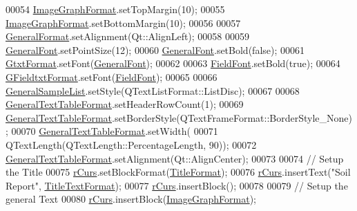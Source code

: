 \begin{DoxyCode}
00054   \hyperlink{class_q_report_generator_a19451127788bb6c68907b312a0a8b750}{ImageGraphFormat}.setTopMargin(10);
00055   \hyperlink{class_q_report_generator_a19451127788bb6c68907b312a0a8b750}{ImageGraphFormat}.setBottomMargin(10);
00056 
00057   \hyperlink{class_q_report_generator_a9a18bc94ca92a730ae0f13d60a6b5e0a}{GeneralFormat}.setAlignment(Qt::AlignLeft);
00058 
00059   \hyperlink{class_q_report_generator_ab7022962a87365f93a5e168d946ebd85}{GeneralFont}.setPointSize(12);
00060   \hyperlink{class_q_report_generator_ab7022962a87365f93a5e168d946ebd85}{GeneralFont}.setBold(\textcolor{keyword}{false});
00061   \hyperlink{class_q_report_generator_ad78e127d228dd0c11c438d4681a20379}{GtxtFormat}.setFont(\hyperlink{class_q_report_generator_ab7022962a87365f93a5e168d946ebd85}{GeneralFont});
00062 
00063   \hyperlink{class_q_report_generator_ae23241660848e9015b6d3bf814d1b381}{FieldFont}.setBold(\textcolor{keyword}{true});
00064   \hyperlink{class_q_report_generator_afa9431684b9e2612f1d508f7e837aec5}{GFieldtxtFormat}.setFont(\hyperlink{class_q_report_generator_ae23241660848e9015b6d3bf814d1b381}{FieldFont});
00065 
00066   \hyperlink{class_q_report_generator_a415a4b3a8995d02b724156b5e9c14486}{GeneralSampleList}.setStyle(QTextListFormat::ListDisc);
00067 
00068   \hyperlink{class_q_report_generator_afcb27e52bd15a286a1933c3b9cf01c92}{GeneralTextTableFormat}.setHeaderRowCount(1);
00069   \hyperlink{class_q_report_generator_afcb27e52bd15a286a1933c3b9cf01c92}{GeneralTextTableFormat}.setBorderStyle(QTextFrameFormat::BorderStyle\_None);
00070   \hyperlink{class_q_report_generator_afcb27e52bd15a286a1933c3b9cf01c92}{GeneralTextTableFormat}.setWidth(
00071       QTextLength(QTextLength::PercentageLength, 90));
00072   \hyperlink{class_q_report_generator_afcb27e52bd15a286a1933c3b9cf01c92}{GeneralTextTableFormat}.setAlignment(Qt::AlignCenter);
00073 
00074   \textcolor{comment}{// Setup the Title}
00075   \hyperlink{class_q_report_generator_af189d3779d26af513e311eea89a78a28}{rCurs}.setBlockFormat(\hyperlink{class_q_report_generator_a1c6eac3b9c26e7fb32de033879ae6e6e}{TitleFormat});
00076   \hyperlink{class_q_report_generator_af189d3779d26af513e311eea89a78a28}{rCurs}.insertText(\textcolor{stringliteral}{"Soil Report"}, \hyperlink{class_q_report_generator_a7eebc837740d933bf4767e584f1d486c}{TitleTextFormat});
00077   \hyperlink{class_q_report_generator_af189d3779d26af513e311eea89a78a28}{rCurs}.insertBlock();
00078 
00079   \textcolor{comment}{// Setup the general Text}
00080   \hyperlink{class_q_report_generator_af189d3779d26af513e311eea89a78a28}{rCurs}.insertBlock(\hyperlink{class_q_report_generator_a19451127788bb6c68907b312a0a8b750}{ImageGraphFormat});

\end{DoxyCode}
